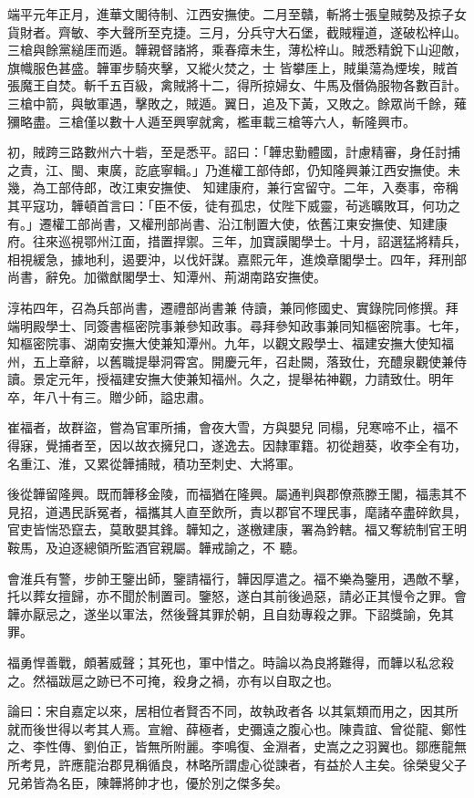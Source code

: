 \begin{pinyinscope}
 端平元年正月，進華文閣待制、江西安撫使。二月至贛，斬將士張皇賊勢及掠子女貨財者。齊敏、李大聲所至克捷。三月，分兵守大石堡，截賊糧道，遂破松梓山。三槍與餘黨縋厓而遁。韡親督諸將，乘春瘴未生，薄松梓山。賊悉精銳下山迎敵，旗幟服色甚盛。韡軍步騎夾擊，又縱火焚之，士
 皆攀厓上，賊巢蕩為煙埃，賊首張魔王自焚。斬千五百級，禽賊將十二，得所掠婦女、牛馬及僭偽服物各數百計。三槍中箭，與敏軍遇，擊敗之，賊遁。翼日，追及下黃，又敗之。餘眾尚千餘，薙獼略盡。三槍僅以數十人遁至興寧就禽，檻車載三槍等六人，斬隆興市。



 初，賊跨三路數州六十砦，至是悉平。詔曰：「韡忠勤體國，計慮精審，身任討捕之責，江、閩、東廣，訖底寧輯。」乃進權工部侍郎，仍知隆興兼江西安撫使。未幾，為工部侍郎，改江東安撫使、
 知建康府，兼行宮留守。二年，入奏事，帝稱其平寇功，韡頓首言曰：「臣不佞，徒有孤忠，仗陛下威靈，茍逃曠敗耳，何功之有。」遷權工部尚書，又權刑部尚書、沿江制置大使，依舊江東安撫使、知建康府。往來巡視鄂州江面，措置捍禦。三年，加寶謨閣學士。十月，詔選猛將精兵，相視緩急，據地利，遏要沖，以伐奸謀。嘉熙元年，進煥章閣學士。四年，拜刑部尚書，辭免。加徽猷閣學士、知潭州、荊湖南路安撫使。



 淳祐四年，召為兵部尚書，遷禮部尚書兼
 侍讀，兼同修國史、實錄院同修撰。拜端明殿學士、同簽書樞密院事兼參知政事。尋拜參知政事兼同知樞密院事。七年，知樞密院事、湖南安撫大使兼知潭州。九年，以觀文殿學士、福建安撫大使知福州，五上章辭，以舊職提舉洞霄宮。開慶元年，召赴闕，落致仕，充醴泉觀使兼侍讀。景定元年，授福建安撫大使兼知福州。久之，提舉祐神觀，力請致仕。明年卒，年八十有三。贈少師，謚忠肅。



 崔福者，故群盜，嘗為官軍所捕，會夜大雪，方與嬰兒
 同榻，兒寒啼不止，福不得寐，覺捕者至，因以故衣擁兒口，遂逸去。因隸軍籍。初從趙葵，收李全有功，名重江、淮，又累從韡捕賊，積功至刺史、大將軍。



 後從韡留隆興。既而韡移金陵，而福猶在隆興。屬通判與郡僚燕滕王閣，福恚其不見招，道遇民訴冤者，福攜其人直至飲所，責以郡官不理民事，麾諸卒盡碎飲具，官吏皆惴恐竄去，莫敢嬰其鋒。韡知之，遂檄建康，署為鈐轄。福又奪統制官王明鞍馬，及迫逐總領所監酒官親屬。韡戒諭之，不
 聽。



 會淮兵有警，步帥王鑒出師，鑒請福行，韡因厚遣之。福不樂為鑒用，遇敵不擊，托以葬女擅歸，亦不聞於制置司。鑒怒，遂白其前後過惡，請必正其慢令之罪。會韡亦厭忌之，遂坐以軍法，然後聲其罪於朝，且自劾專殺之罪。下詔獎諭，免其罪。



 福勇悍善戰，頗著威聲；其死也，軍中惜之。時論以為良將難得，而韡以私忿殺之。然福跋扈之跡已不可掩，殺身之禍，亦有以自取之也。



 論曰：宋自嘉定以來，居相位者賢否不同，故執政者各
 以其氣類而用之，因其所就而後世得以考其人焉。宣繒、薛極者，史彌遠之腹心也。陳貴誼、曾從龍、鄭性之、李性傳、劉伯正，皆無所附麗。李鳴復、金淵者，史嵩之之羽翼也。鄒應龍無所考見，許應龍治郡見稱循良，林略所謂虛心從諫者，有益於人主矣。徐榮叟父子兄弟皆為名臣，陳韡將帥才也，優於別之傑多矣。



\end{pinyinscope}